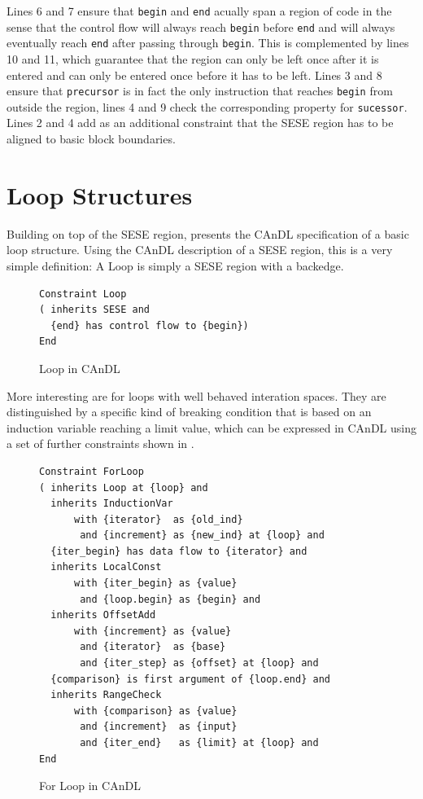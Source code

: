     Lines 6 and 7 ensure that {\tt begin} and {\tt end} acually span a region of
    code in the sense that the control flow will always reach {\tt begin} before
    {\tt end} and will always eventually reach {\tt end} after passing through
    {\tt begin}.
    This is complemented by lines 10 and 11, which guarantee that the region can
    only be left once after it is entered and can only be entered once before it
    has to be left.
    Lines 3 and 8 ensure that {\tt precursor} is in fact the only instruction
    that reaches {\tt begin} from outside the region, lines 4 and 9 check the
    corresponding property for {\tt sucessor}.
    Lines 2 and 4 add as an additional constraint that the SESE region has to be
    aligned to basic block boundaries.

\section{Loop Structures}
    Building on top of the SESE region,  presents the CAnDL
    specification of a basic loop structure.
    Using the CAnDL description of a SESE region, this is a very simple
    definition: A Loop is simply a SESE region with a backedge.

\begin{figure}[h]
\begin{lstlisting}[language=CAnDL]
Constraint Loop
( inherits SESE and
  {end} has control flow to {begin})
End
\end{lstlisting}
\caption{Loop in CAnDL}
\label{candl_loop}
\end{figure}

    More interesting are for loops with well behaved interation spaces.
    They are distinguished by a specific kind of breaking condition that is
    based on an induction variable reaching a limit value, which can be
    expressed in CAnDL using a set of further constraints shown in
    .

\begin{figure}[h]
\begin{lstlisting}[language=CAnDL]
Constraint ForLoop
( inherits Loop at {loop} and
  inherits InductionVar
      with {iterator}  as {old_ind}
       and {increment} as {new_ind} at {loop} and
  {iter_begin} has data flow to {iterator} and
  inherits LocalConst
      with {iter_begin} as {value}
       and {loop.begin} as {begin} and
  inherits OffsetAdd
      with {increment} as {value}
       and {iterator}  as {base}
       and {iter_step} as {offset} at {loop} and
  {comparison} is first argument of {loop.end} and
  inherits RangeCheck
      with {comparison} as {value}
       and {increment}  as {input}
       and {iter_end}   as {limit} at {loop} and
End
\end{lstlisting}
\caption{For Loop in CAnDL}
\label{candl_forloop}
\end{figure}

